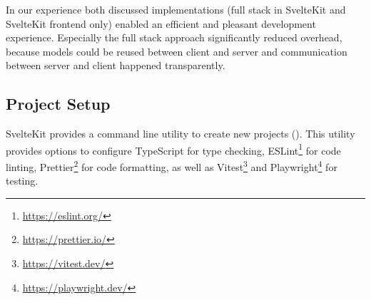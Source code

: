 In our experience both discussed implementations (full stack in SvelteKit and SvelteKit frontend only) enabled an efficient and pleasant development experience. Especially the full stack approach significantly reduced overhead, because models could be reused between client and server and communication between server and client happened transparently.


\subsection{Project Setup}
SvelteKit provides a command line utility to create new projects (). This utility provides options to configure TypeScript for type checking, ESLint\footnote{\url{https://eslint.org/}} for code linting, Prettier\footnote{\url{https://prettier.io/}} for code formatting, as well as Vitest\footnote{\url{https://vitest.dev/}} and Playwright\footnote{\url{https://playwright.dev/}} for testing. 


